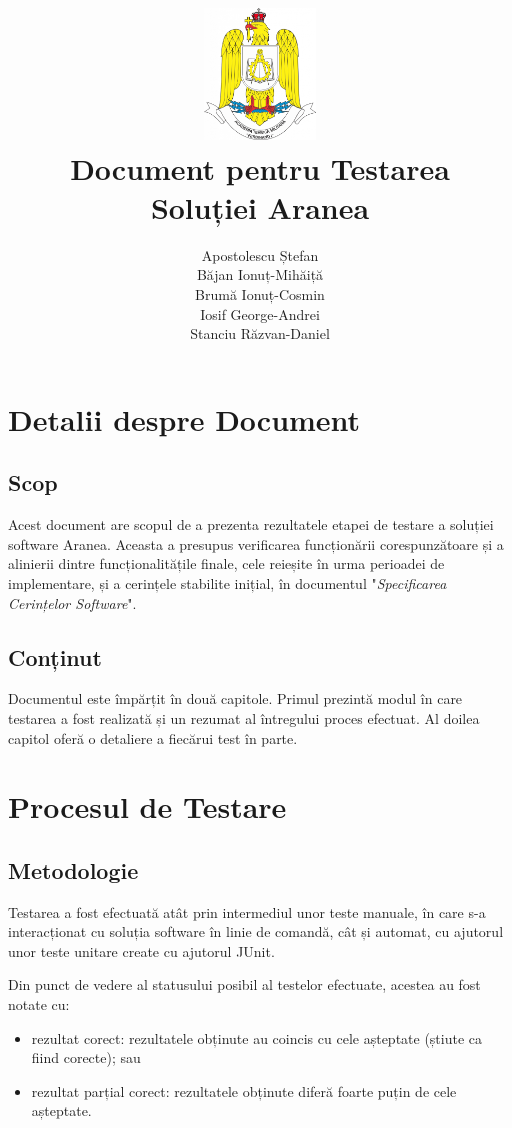 \documentclass[12pt]{article}
\title{
    \includegraphics[width=3cm, height=3.5cm]{Academy Logo.png} \\
    \vspace{5mm}
    {Document pentru Testarea\\
    Soluției \textbf{Aranea}}
    \vspace{10mm}
}
\author{
    Apostolescu Ștefan \\
    Băjan Ionuț-Mihăiță \\
    Brumă Ionuț-Cosmin \\
    Iosif George-Andrei \\
    Stanciu Răzvan-Daniel \\
    \vspace{10mm}
}
\begin{document}
\null
\nointerlineskip 
\vfill
\let\snewpage \newpage
\let\newpage \relax
\maketitle
\let \newpage \snewpage
\vfill 
\break

\newpage

\tableofcontents

\newpage

\listoflistings

\newpage

\section{Detalii despre Document}

\subsection{Scop}
Acest document are scopul de a prezenta rezultatele etapei de testare a soluției software Aranea. Aceasta a presupus verificarea funcționării corespunzătoare și a alinierii dintre funcționalitățile finale, cele reieșite în urma perioadei de implementare, și a cerințele stabilite inițial, în documentul "\textit{Specificarea Cerințelor Software}".

\subsection{Conținut}
Documentul este împărțit în două capitole. Primul prezintă modul în care testarea a fost realizată și un rezumat al întregului proces efectuat. Al doilea capitol oferă o detaliere a fiecărui test în parte.

\newpage

\section{Procesul de Testare}

\subsection{Metodologie}

Testarea a fost efectuată atât prin intermediul unor teste manuale, în care s-a interacționat cu soluția software în linie de comandă, cât și automat, cu ajutorul unor teste unitare create cu ajutorul JUnit.

Din punct de vedere al statusului posibil al testelor efectuate, acestea au fost notate cu:
\begin{itemize}
    \item rezultat corect: rezultatele obținute au coincis cu cele așteptate (știute ca fiind corecte); sau
    \item rezultat parțial corect: rezultatele obținute diferă foarte puțin de cele așteptate.
\end{itemize}
\end{document}
